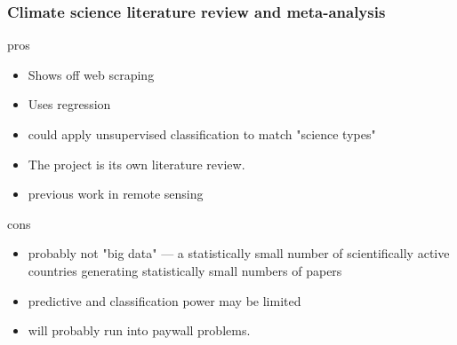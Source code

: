 \documentclass[aspectratio=169,12pt]{beamer}
\begin{document}
\begin{frame}\frametitle{Climate science literature review and meta-analysis}
	\begin{block}{pros}
		\begin{itemize}
			\item Shows off web scraping
			\item Uses regression
			\item could apply unsupervised classification to match "science types"
			\item The project is its own literature review.
			\item previous work in remote sensing
		\end{itemize}
	\end{block}
	\begin{alertblock}{cons}
		\begin{itemize}
			\item probably not "big data" ---  a statistically small number of scientifically active countries generating statistically small numbers of papers
			\item predictive and classification power may be limited
			\item will probably run into paywall problems.
		\end{itemize}
	\end{alertblock}
\end{frame}
\end{document}

